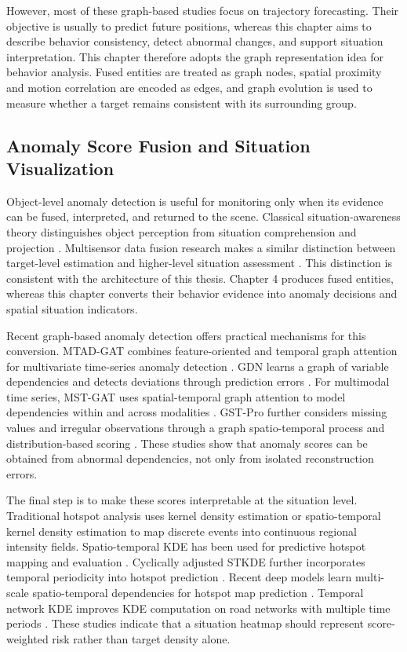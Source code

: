 However, most of these graph-based studies focus on trajectory forecasting. Their objective is usually to predict future positions, whereas this chapter aims to describe behavior consistency, detect abnormal changes, and support situation interpretation. This chapter therefore adopts the graph representation idea for behavior analysis. Fused entities are treated as graph nodes, spatial proximity and motion correlation are encoded as edges, and graph evolution is used to measure whether a target remains consistent with its surrounding group.

\subsection{Anomaly Score Fusion and Situation Visualization}
Object-level anomaly detection is useful for monitoring only when its evidence can be fused, interpreted, and returned to the scene. Classical situation-awareness theory distinguishes object perception from situation comprehension and projection \cite{endsley1995situation}. Multisensor data fusion research makes a similar distinction between target-level estimation and higher-level situation assessment \cite{hall1997multisensor,blasch2009blueprint}. This distinction is consistent with the architecture of this thesis. Chapter 4 produces fused entities, whereas this chapter converts their behavior evidence into anomaly decisions and spatial situation indicators.

Recent graph-based anomaly detection offers practical mechanisms for this conversion. MTAD-GAT combines feature-oriented and temporal graph attention for multivariate time-series anomaly detection \cite{zhao2020mtadgat}. GDN learns a graph of variable dependencies and detects deviations through prediction errors \cite{deng2021gdn}. For multimodal time series, MST-GAT uses spatial-temporal graph attention to model dependencies within and across modalities \cite{ding2023mstgat}. GST-Pro further considers missing values and irregular observations through a graph spatio-temporal process and distribution-based scoring \cite{zheng2024gstpro}. These studies show that anomaly scores can be obtained from abnormal dependencies, not only from isolated reconstruction errors.

The final step is to make these scores interpretable at the situation level. Traditional hotspot analysis uses kernel density estimation or spatio-temporal kernel density estimation to map discrete events into continuous regional intensity fields. Spatio-temporal KDE has been used for predictive hotspot mapping and evaluation \cite{hu2018stkde}. Cyclically adjusted STKDE further incorporates temporal periodicity into hotspot prediction \cite{han2023cstkde}. Recent deep models learn multi-scale spatio-temporal dependencies for hotspot map prediction \cite{jing2024sthgnet}. Temporal network KDE improves KDE computation on road networks with multiple time periods \cite{shao2025tnkde}. These studies indicate that a situation heatmap should represent score-weighted risk rather than target density alone.

